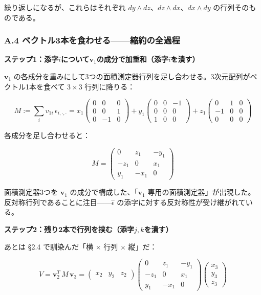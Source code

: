 \documentclass[a4paper,12pt,openany]{book}
\begin{document}
繰り返しになるが、これらはそれぞれ
\(dy \wedge dz\)、\(dz \wedge dx\)、\(dx \wedge dy\)
の行列そのものである。

\hypertarget{a.4-ux30d9ux30afux30c8ux30eb3ux672cux3092ux98dfux308fux305bux308bux7e2eux7d04ux306eux5168ux904eux7a0b}{%
\subsubsection*{A.4
ベクトル3本を食わせる——縮約の全過程}\label{a.4-ux30d9ux30afux30c8ux30eb3ux672cux3092ux98dfux308fux305bux308bux7e2eux7d04ux306eux5168ux904eux7a0b}}

\textbf{ステップ1：添字}\(i\)\textbf{について}\(\mathbf{v}_1\)\textbf{の成分で加重和（添字}\(i\)\textbf{を潰す）}

\(\mathbf{v}_1\)
の各成分を重みにして3つの面積測定器行列を足し合わせる。3次元配列がベクトル1本を食べて
\(3 \times 3\) 行列に降りる：

\[M := \sum_i v_{1i}\, \epsilon_{i,\cdot,\cdot} = x_1 \begin{pmatrix} 0 & 0 & 0 \\ 0 & 0 & 1 \\ 0 & -1 & 0 \end{pmatrix} + y_1 \begin{pmatrix} 0 & 0 & -1 \\ 0 & 0 & 0 \\ 1 & 0 & 0 \end{pmatrix} + z_1 \begin{pmatrix} 0 & 1 & 0 \\ -1 & 0 & 0 \\ 0 & 0 & 0 \end{pmatrix}\]

各成分を足し合わせると：

\[M = \begin{pmatrix} 0 & z_1 & -y_1 \\ -z_1 & 0 & x_1 \\ y_1 & -x_1 & 0 \end{pmatrix}\]

面積測定器3つを \(\mathbf{v}_1\) の成分で構成した、「\(\mathbf{v}_1\)
専用の面積測定器」が出現した。反対称行列であることに注目——\(\widehat{\epsilon}\)
の添字に対する反対称性が受け継がれている。

\textbf{ステップ2：残り2本で行列を挟む（添字}\(j, k\)\textbf{を潰す）}

あとは §2.4 で馴染んだ「横 \(\times\) 行列 \(\times\) 縦」だ：

\[V = \mathbf{v}_2^T\, M\, \mathbf{v}_3 = \begin{pmatrix} x_2 & y_2 & z_2 \end{pmatrix} \begin{pmatrix} 0 & z_1 & -y_1 \\ -z_1 & 0 & x_1 \\ y_1 & -x_1 & 0 \end{pmatrix} \begin{pmatrix} x_3 \\ y_3 \\ z_3 \end{pmatrix}\]
\end{document}
